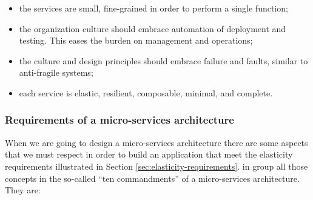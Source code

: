 \begin{itemize}
	\item{the services are small, fine-grained in order to perform a single function;}
	\item{the organization culture should embrace automation of deployment and testing. This eases the burden
		on management and operations;}
	\item{the culture and design principles should embrace failure and faults, similar to anti-fragile systems;}
	\item{each service is elastic, resilient, composable, minimal, and complete.}
\end{itemize}

\subsubsection{Requirements of a micro-services architecture}
\label{sec:architecture-soaRevisitation-microServices-requirements}
When we are going to design a micro-services architecture there are some aspects that we must respect in order
to build an application that meet the elasticity requirements illustrated in Section \ref{sec:elasticity-requirements}.
\citeauthor{microservicesCommandments} in \cite{microservicesCommandments} group all those concepts in the
so-called ``ten commandments'' of a micro-services architecture. They are:

